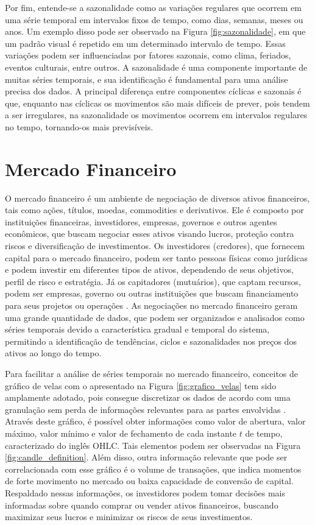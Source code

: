 Por fim, entende-se a sazonalidade como as variações regulares que ocorrem em uma série temporal em intervalos fixos de tempo, como dias, semanas, meses ou anos. Um exemplo disso pode ser observado na Figura \ref{fig:sazonalidade}, em que um padrão visual é repetido em um determinado intervalo de tempo. Essas variações podem ser influenciadas por fatores sazonais, como clima, feriados, eventos culturais, entre outros. A sazonalidade é uma componente importante de muitas séries temporais, e sua identificação é fundamental para uma análise precisa dos dados. A principal diferença entre componentes cíclicas e sazonais é que, enquanto nas cíclicas os movimentos são mais difíceis de prever, pois tendem a ser irregulares, na sazonalidade os movimentos ocorrem em intervalos regulares no tempo, tornando-os mais previsíveis. 

\section{Mercado Financeiro}
\label{subsec:mercado_financeiro}
O mercado financeiro é um ambiente de negociação de diversos ativos financeiros, tais como ações, títulos, moedas, commodities e derivativos. Ele é composto por instituições financeiras, investidores, empresas, governos e outros agentes econômicos, que buscam negociar esses ativos visando lucros, proteção contra riscos e diversificação de investimentos. Os investidores (credores), que fornecem capital para o mercado financeiro, podem ser tanto pessoas físicas como jurídicas e podem investir em diferentes tipos de ativos, dependendo de seus objetivos, perfil de risco e estratégia. Já os capitadores (mutuários), que captam recursos, podem ser empresas, governo ou outras instituições que buscam financiamento para seus projetos ou operações \cite{mercado}. As negociações no mercado financeiro geram uma grande quantidade de dados, que podem ser organizados e analisados como séries temporais devido a característica gradual e temporal do sistema, permitindo a identificação de tendências, ciclos e sazonalidades nos preços dos ativos ao longo do tempo. 

Para facilitar a análise de séries temporais no mercado financeiro, conceitos de gráfico de velas com o apresentado na Figura \ref{fig:grafico_velas} tem sido amplamente adotado, pois consegue discretizar os dados de acordo com uma granulação sem perda de informações relevantes para as partes envolvidas \cite{bulkowski2012encyclopedia}. Através deste gráfico, é possível obter informações como valor de abertura, valor máximo, valor mínimo e valor de fechamento de cada instante $t$ de tempo, caracterizado do inglês \ac{OHLC}. Tais elementos podem ser observadas na Figura \ref{fig:candle_definition}. Além disso, outra informação relevante que pode ser correlacionada com esse gráfico é o volume de transações, que indica momentos de forte movimento no mercado ou baixa capacidade de conversão de capital. Respaldado nessas informações, os investidores podem tomar decisões mais informadas sobre quando comprar ou vender ativos financeiros, buscando maximizar seus lucros e minimizar os riscos de seus investimentos.

